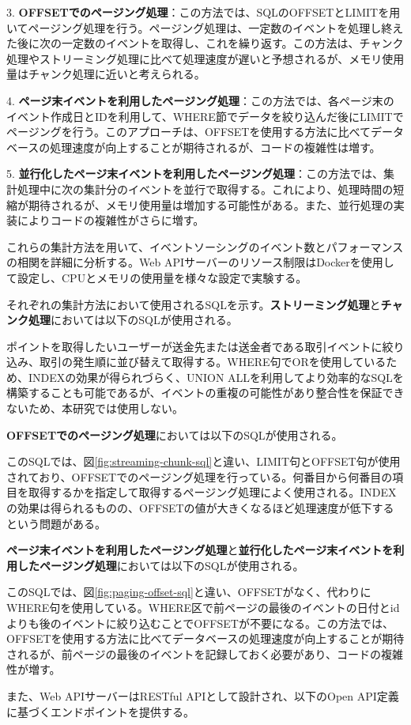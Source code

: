 \documentclass[../../../main]{subfiles}
\begin{document}
    3. \textbf{OFFSETでのページング処理}：この方法では、SQLのOFFSETとLIMITを用いてページング処理を行う。ページング処理は、一定数のイベントを処理し終えた後に次の一定数のイベントを取得し、これを繰り返す。この方法は、チャンク処理やストリーミング処理に比べて処理速度が遅いと予想されるが、メモリ使用量はチャンク処理に近いと考えられる。

    4. \textbf{ページ末イベントを利用したページング処理}：この方法では、各ページ末のイベント作成日とIDを利用して、WHERE節でデータを絞り込んだ後にLIMITでページングを行う。このアプローチは、OFFSETを使用する方法に比べてデータベースの処理速度が向上することが期待されるが、コードの複雑性は増す。

    5. \textbf{並行化したページ末イベントを利用したページング処理}：この方法では、集計処理中に次の集計分のイベントを並行で取得する。これにより、処理時間の短縮が期待されるが、メモリ使用量は増加する可能性がある。また、並行処理の実装によりコードの複雑性がさらに増す。

    これらの集計方法を用いて、イベントソーシングのイベント数とパフォーマンスの相関を詳細に分析する。Web APIサーバーのリソース制限はDockerを使用して設定し、CPUとメモリの使用量を様々な設定で実験する。

    それぞれの集計方法において使用されるSQLを示す。\textbf{ストリーミング処理}と\textbf{チャンク処理}においては以下のSQLが使用される。

    

    ポイントを取得したいユーザーが送金先または送金者である取引イベントに絞り込み、取引の発生順に並び替えて取得する。WHERE句でORを使用しているため、INDEXの効果が得られづらく、UNION ALLを利用してより効率的なSQLを構築することも可能であるが、イベントの重複の可能性があり整合性を保証できないため、本研究では使用しない。

    \textbf{OFFSETでのページング処理}においては以下のSQLが使用される。

    

    このSQLでは、図\ref{fig:streaming-chunk-sql}と違い、LIMIT句とOFFSET句が使用されており、OFFSETでのページング処理を行っている。何番目から何番目の項目を取得するかを指定して取得するページング処理によく使用される。INDEXの効果は得られるものの、OFFSETの値が大きくなるほど処理速度が低下するという問題がある。

    \textbf{ページ末イベントを利用したページング処理}と\textbf{並行化したページ末イベントを利用したページング処理}においては以下のSQLが使用される。

    

    このSQLでは、図\ref{fig:paging-offset-sql}と違い、OFFSETがなく、代わりにWHERE句を使用している。WHERE区で前ページの最後のイベントの日付とidよりも後のイベントに絞り込むことでOFFSETが不要になる。この方法では、OFFSETを使用する方法に比べてデータベースの処理速度が向上することが期待されるが、前ページの最後のイベントを記録しておく必要があり、コードの複雑性が増す。

    また、Web APIサーバーはRESTful APIとして設計され、以下のOpen API定義に基づくエンドポイントを提供する。

    
\end{document}
